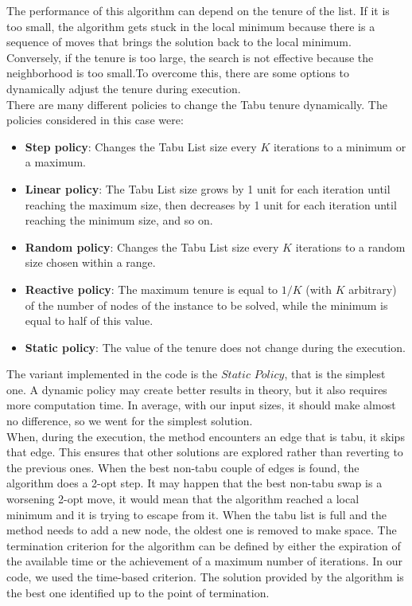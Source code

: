 The performance of this algorithm can depend on the tenure of the list. If it is too small, the algorithm gets stuck in the local minimum because there is a sequence of moves that brings the solution back to the local minimum. Conversely, if the tenure is too large, the search is not effective because the neighborhood is too small.To overcome this, there are some options to dynamically adjust the tenure during execution.\\

There are many different policies to change the Tabu tenure dynamically. The policies considered in this case were:
\begin{itemize}
    \item \textbf{Step policy}: Changes the Tabu List size every \(K\) iterations to a minimum or a maximum.
    \item \textbf{Linear policy}: The Tabu List size grows by 1 unit for each iteration until reaching the maximum size, then decreases by 1 unit for each iteration until reaching the minimum size, and so on.
    \item \textbf{Random policy}: Changes the Tabu List size every \(K\) iterations to a random size chosen within a range.
    \item \textbf{Reactive policy}: The maximum tenure is equal to \(1/K\) (with \(K\) arbitrary) of the number of nodes of the instance to be solved, while the minimum is equal to half of this value.
    \item \textbf{Static policy}: The value of the tenure does not change during the execution.
\end{itemize}

The variant implemented in the code is the \(Static\) \(Policy\), that is the simplest one. A dynamic policy may create better results in theory, but it also requires more computation time. In average, with our input sizes, it should make almost no difference, so we went for the simplest solution.\\

When, during the execution, the method encounters an edge that is tabu, it skips that edge. This ensures that other solutions are explored rather than reverting to the previous ones. When the best non-tabu couple of edges is found, the algorithm does a 2-opt step. It may happen that the best non-tabu swap is a worsening 2-opt move, it would mean that the algorithm reached a local minimum and it is trying to escape from it. 
When the tabu list is full and the method needs to add a new node, the oldest one is removed to make space.
The termination criterion for the algorithm can be defined by either the expiration of the available time or the achievement of a maximum number of iterations. In our code, we used the time-based criterion. The solution provided by the algorithm is the best one identified up to the point of termination.

